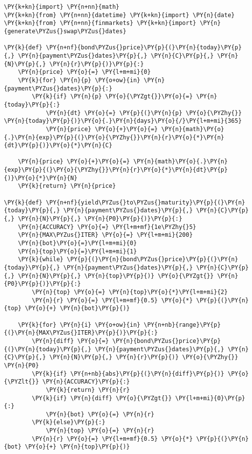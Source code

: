 \begin{codebox}
\begin{Verbatim}[commandchars=\\\{\}]
\PY{k+kn}{import} \PY{n+nn}{math}
\PY{k+kn}{from} \PY{n+nn}{datetime} \PY{k+kn}{import} \PY{n}{date}
\PY{k+kn}{from} \PY{n+nn}{finmarkets} \PY{k+kn}{import} \PY{n}{generate\PYZus{}swap\PYZus{}dates}
		
\PY{k}{def} \PY{n+nf}{bond\PYZus{}price}\PY{p}{(}\PY{n}{today}\PY{p}{,} \PY{n}{payment\PYZus{}dates}\PY{p}{,} \PY{n}{C}\PY{p}{,} \PY{n}{N}\PY{p}{,} \PY{n}{r}\PY{p}{)}\PY{p}{:}
    \PY{n}{price} \PY{o}{=} \PY{l+m+mi}{0}
    \PY{k}{for} \PY{n}{p} \PY{o+ow}{in} \PY{n}{payment\PYZus{}dates}\PY{p}{:}
        \PY{k}{if} \PY{n}{p} \PY{o}{\PYZgt{}}\PY{o}{=} \PY{n}{today}\PY{p}{:}
            \PY{n}{dt} \PY{o}{=} \PY{p}{(}\PY{n}{p} \PY{o}{\PYZhy{}} \PY{n}{today}\PY{p}{)}\PY{o}{.}\PY{n}{days}\PY{o}{/}\PY{l+m+mi}{365}
            \PY{n}{price} \PY{o}{+}\PY{o}{=} \PY{n}{math}\PY{o}{.}\PY{n}{exp}\PY{p}{(}\PY{o}{\PYZhy{}}\PY{n}{r}\PY{o}{*}\PY{n}{dt}\PY{p}{)}\PY{o}{*}\PY{n}{C}
		
    \PY{n}{price} \PY{o}{+}\PY{o}{=} \PY{n}{math}\PY{o}{.}\PY{n}{exp}\PY{p}{(}\PY{o}{\PYZhy{}}\PY{n}{r}\PY{o}{*}\PY{n}{dt}\PY{p}{)}\PY{o}{*}\PY{n}{N}
    \PY{k}{return} \PY{n}{price}
		
\PY{k}{def} \PY{n+nf}{yield\PYZus{}to\PYZus{}maturity}\PY{p}{(}\PY{n}{today}\PY{p}{,} \PY{n}{payment\PYZus{}dates}\PY{p}{,} \PY{n}{C}\PY{p}{,} \PY{n}{N}\PY{p}{,} \PY{n}{P0}\PY{p}{)}\PY{p}{:}
    \PY{n}{ACCURACY} \PY{o}{=} \PY{l+m+mf}{1e\PYZhy{}5}
    \PY{n}{MAX\PYZus{}ITER} \PY{o}{=} \PY{l+m+mi}{200}
    \PY{n}{bot}\PY{o}{=}\PY{l+m+mi}{0}
    \PY{n}{top}\PY{o}{=}\PY{l+m+mi}{1}
    \PY{k}{while} \PY{p}{(}\PY{n}{bond\PYZus{}price}\PY{p}{(}\PY{n}{today}\PY{p}{,} \PY{n}{payment\PYZus{}dates}\PY{p}{,} \PY{n}{C}\PY{p}{,} \PY{n}{N}\PY{p}{,} \PY{n}{top}\PY{p}{)} \PY{o}{\PYZgt{}} \PY{n}{P0}\PY{p}{)}\PY{p}{:}
        \PY{n}{top} \PY{o}{=} \PY{n}{top}\PY{o}{*}\PY{l+m+mi}{2}
        \PY{n}{r} \PY{o}{=} \PY{l+m+mf}{0.5} \PY{o}{*} \PY{p}{(}\PY{n}{top} \PY{o}{+} \PY{n}{bot}\PY{p}{)}
    
    \PY{k}{for} \PY{n}{i} \PY{o+ow}{in} \PY{n+nb}{range}\PY{p}{(}\PY{n}{MAX\PYZus{}ITER}\PY{p}{)}\PY{p}{:}
        \PY{n}{diff} \PY{o}{=} \PY{n}{bond\PYZus{}price}\PY{p}{(}\PY{n}{today}\PY{p}{,} \PY{n}{payment\PYZus{}dates}\PY{p}{,} \PY{n}{C}\PY{p}{,} \PY{n}{N}\PY{p}{,} \PY{n}{r}\PY{p}{)} \PY{o}{\PYZhy{}} \PY{n}{P0}
        \PY{k}{if} \PY{n+nb}{abs}\PY{p}{(}\PY{n}{diff}\PY{p}{)} \PY{o}{\PYZlt{}} \PY{n}{ACCURACY}\PY{p}{:}
            \PY{k}{return} \PY{n}{r}
        \PY{k}{if} \PY{n}{diff} \PY{o}{\PYZgt{}} \PY{l+m+mi}{0}\PY{p}{:}
            \PY{n}{bot} \PY{o}{=} \PY{n}{r}
        \PY{k}{else}\PY{p}{:}
            \PY{n}{top} \PY{o}{=} \PY{n}{r}
        \PY{n}{r} \PY{o}{=} \PY{l+m+mf}{0.5} \PY{o}{*} \PY{p}{(}\PY{n}{bot} \PY{o}{+} \PY{n}{top}\PY{p}{)}
		

\end{Verbatim}
\end{codebox}
